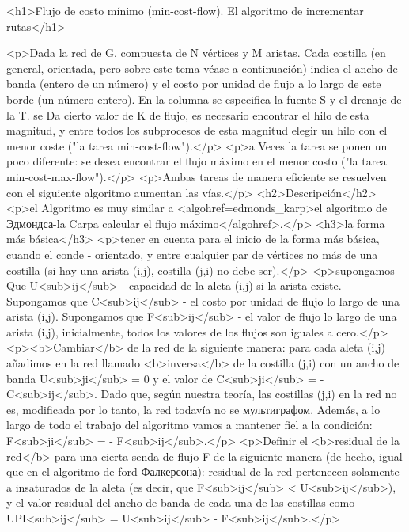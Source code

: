 <h1>Flujo de costo mínimo (min-cost-flow). El algoritmo de incrementar rutas</h1>

<p>Dada la red de G, compuesta de N vértices y M aristas. Cada costilla (en general, orientada, pero sobre este tema véase a continuación) indica el ancho de banda (entero de un número) y el costo por unidad de flujo a lo largo de este borde (un número entero). En la columna se especifica la fuente S y el drenaje de la T. se Da cierto valor de K de flujo, es necesario encontrar el hilo de esta magnitud, y entre todos los subprocesos de esta magnitud elegir un hilo con el menor coste ("la tarea min-cost-flow").</p>
<p>a Veces la tarea se ponen un poco diferente: se desea encontrar el flujo máximo en el menor costo ("la tarea min-cost-max-flow").</p>
<p>Ambas tareas de manera eficiente se resuelven con el siguiente algoritmo aumentan las vías.</p>
<h2>Descripción</h2>
<p>el Algoritmo es muy similar a <algohref=edmonds_karp>el algoritmo de Эдмондса-la Carpa calcular el flujo máximo</algohref>.</p>
<h3>la forma más básica</h3>
<p>tener en cuenta para el inicio de la forma más básica, cuando el conde - orientado, y entre cualquier par de vértices no más de una costilla (si hay una arista (i,j), costilla (j,i) no debe ser).</p>
<p>supongamos Que U<sub>ij</sub> - capacidad de la aleta (i,j) si la arista existe. Supongamos que C<sub>ij</sub> - el costo por unidad de flujo lo largo de una arista (i,j). Supongamos que F<sub>ij</sub> - el valor de flujo lo largo de una arista (i,j), inicialmente, todos los valores de los flujos son iguales a cero.</p>
<p><b>Cambiar</b> de la red de la siguiente manera: para cada aleta (i,j) añadimos en la red llamado <b>inversa</b> de la costilla (j,i) con un ancho de banda U<sub>ji</sub> = 0 y el valor de C<sub>ji</sub> = - C<sub>ij</sub>. Dado que, según nuestra teoría, las costillas (j,i) en la red no es, modificada por lo tanto, la red todavía no se мультиграфом. Además, a lo largo de todo el trabajo del algoritmo vamos a mantener fiel a la condición: F<sub>ji</sub> = - F<sub>ij</sub>.</p>
<p>Definir el <b>residual de la red</b> para una cierta senda de flujo F de la siguiente manera (de hecho, igual que en el algoritmo de ford-Фалкерсона): residual de la red pertenecen solamente a insaturados de la aleta (es decir, que F<sub>ij</sub> < U<sub>ij</sub>), y el valor residual del ancho de banda de cada una de las costillas como UPI<sub>ij</sub> = U<sub>ij</sub> - F<sub>ij</sub>.</p>

